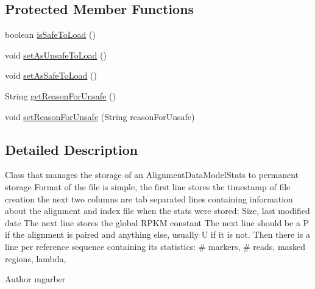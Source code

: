 \subsection*{Protected Member Functions}
\begin{DoxyCompactItemize}
\item 
boolean \hyperlink{classbroad_1_1pda_1_1seq_1_1alignment_1_1_stored_alignment_stats_a797882c7239d6c3c704ed036ddaa35b8}{is\+Safe\+To\+Load} ()
\item 
void \hyperlink{classbroad_1_1pda_1_1seq_1_1alignment_1_1_stored_alignment_stats_a34b212862579dc340afdedcd9ce5dcb5}{set\+As\+Unsafe\+To\+Load} ()
\item 
void \hyperlink{classbroad_1_1pda_1_1seq_1_1alignment_1_1_stored_alignment_stats_a1075082a881e90156fc22508ad3b3ff5}{set\+As\+Safe\+To\+Load} ()
\item 
String \hyperlink{classbroad_1_1pda_1_1seq_1_1alignment_1_1_stored_alignment_stats_af0536b5d93aa4aadb3385d91a53147ad}{get\+Reason\+For\+Unsafe} ()
\item 
void \hyperlink{classbroad_1_1pda_1_1seq_1_1alignment_1_1_stored_alignment_stats_a25319ed55ddcf27110c3228505ebb032}{set\+Reason\+For\+Unsafe} (String reason\+For\+Unsafe)
\end{DoxyCompactItemize}


\subsection{Detailed Description}
Class that manages the storage of an Alignment\+Data\+Model\+Stats to permanent storage Format of the file is simple, the first line stores the timestamp of file creation the next two columns are tab separated lines containing information about the alignment and index file when the stats were stored\+: Size, last modified date The next line stores the global R\+P\+K\+M constant The next line should be a P if the alignment is paired and anything else, usually U if it is not. Then there is a line per reference sequence containing its statistics\+: \# markers, \# reads, masked regions, lambda, \begin{DoxyAuthor}{Author}
mgarber 
\end{DoxyAuthor}


